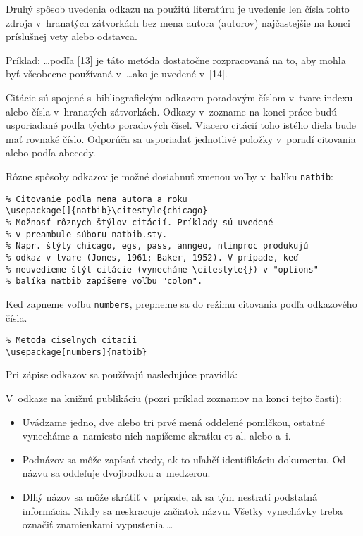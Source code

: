 Druhý spôsob uvedenia odkazu na použitú literatúru je uvedenie len
čísla tohto zdroja v~hranatých zátvorkách bez mena autora (autorov)
najčastejšie na konci príslušnej vety alebo odstavca.

\medskip

Príklad:
\dots podľa [13] je táto metóda dostatočne rozpracovaná na to, aby
mohla byť\/ všeobecne používaná v~\dots ako je uvedené v~[14].

\medskip

Citácie sú spojené s~bibliografickým odkazom poradovým číslom v~tvare
indexu alebo čísla v~hranatých zátvorkách. Odkazy v~zozname na konci
práce budú usporiadané podľa týchto poradových čísel. Viacero citácií
toho istého diela bude mať\/ rovnaké číslo. Odporúča sa usporiadať\/
jednotlivé položky v~poradí citovania alebo podľa abecedy.

\medskip
\noindent
Rôzne spôsoby odkazov je možné dosiahnuť\/ zmenou voľby v~balíku
\verb+natbib+:

\noindent
\verb+% Citovanie podla mena autora a roku+\\
\verb+\usepackage[]{natbib}\citestyle{chicago}+\\
\verb+% Možnosť rôznych štýlov citácií. Príklady sú uvedené+\\
\verb+% v preambule súboru natbib.sty.+\\
\verb+% Napr. štýly chicago, egs, pass, anngeo, nlinproc produkujú+\\
\verb+% odkaz v tvare (Jones, 1961; Baker, 1952). V prípade, keď+\\
\verb+% neuvedieme štýl citácie (vynecháme \citestyle{}) v "options"+\\
\verb+% balíka natbib zapíšeme voľbu "colon".+

\medskip
\noindent
Keď zapneme voľbu \verb+numbers+, prepneme sa do režimu citovania
podľa odkazového čísla.

\noindent
\verb+% Metoda ciselnych citacii+\\
\verb+\usepackage[numbers]{natbib}+

\bigskip

Pri zápise odkazov sa používajú nasledujúce pravidlá:

V~odkaze na knižnú publikáciu (pozri príklad zoznamov na konci tejto
časti):
\begin{itemize}
\item Uvádzame jedno, dve alebo tri prvé mená oddelené pomlčkou,
ostatné vynecháme a~namiesto nich napíšeme skratku et al. alebo a~i.
\item Podnázov sa môže zapísať\/ vtedy, ak to uľahčí identifikáciu
dokumentu. Od názvu sa oddeľuje dvojbodkou a~medzerou.
\item Dlhý názov sa môže skrátiť\/ v~prípade, ak sa tým nestratí
podstatná informácia. Nikdy sa neskracuje začiatok názvu. Všetky
vynechávky treba označiť\/ znamienkami vypustenia  \dots
\end{itemize}

